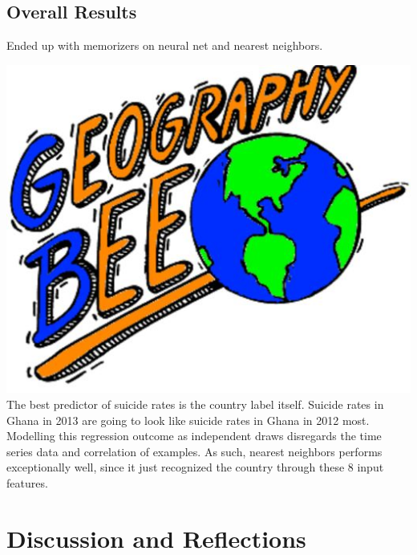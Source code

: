 \documentclass{article}
\begin{document}
\begin{multicols}{2}
\subsection{Overall Results}

Ended up with memorizers on neural net and nearest neighbors.

\includegraphics[width=\columnwidth]{geo-bee.jpg}
The best predictor of suicide rates is the country label itself. Suicide rates in Ghana in 2013 are going to look like suicide rates in Ghana in 2012 most. Modelling this regression outcome as independent draws disregards the time series data and correlation of examples. As such, nearest neighbors performs exceptionally well, since it just recognized the country through these 8 input features. 

\section{Discussion and Reflections}


\end{multicols}
\end{document}
